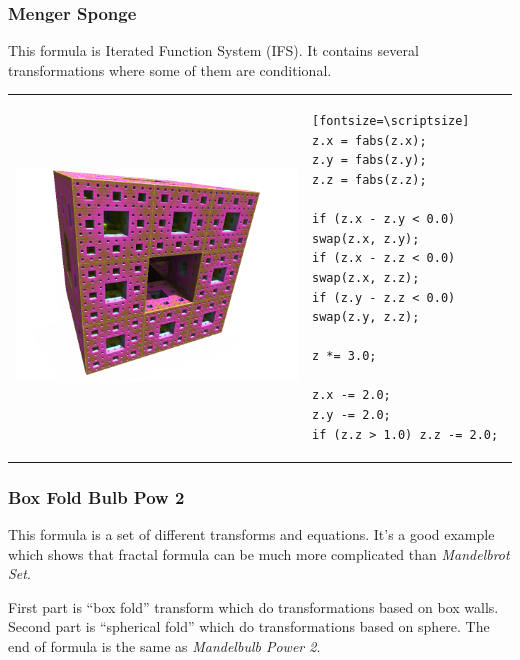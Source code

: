 \subsubsection{Menger Sponge} \nopagebreak

This formula is Iterated Function System (IFS). It contains several
transformations where some of them are conditional. \nopagebreak

\begin{tabular}{l l}
	\includegraphics[width=0.3\linewidth]{img/manual/media/formula_menger_sponge.png}	
	& 
	\begin{minipage}[b]{0.5\linewidth}
		\begin{verbatim}[fontsize=\scriptsize]
z.x = fabs(z.x);
z.y = fabs(z.y);
z.z = fabs(z.z);
		
if (z.x - z.y < 0.0) swap(z.x, z.y);
if (z.x - z.z < 0.0) swap(z.x, z.z);
if (z.y - z.z < 0.0) swap(z.y, z.z);
		
z *= 3.0;
		
z.x -= 2.0;
z.y -= 2.0;
if (z.z > 1.0) z.z -= 2.0;
		\end{verbatim}
	\end{minipage}
\end{tabular} 

\subsubsection{Box Fold Bulb Pow 2}
\nopagebreak

This formula is a set of different transforms and equations. It's a good example
which shows that fractal formula can be much more complicated than
\emph{Mandelbrot Set}.

First part is ``box fold'' transform which do
transformations based on box walls. Second part is ``spherical
fold'' which do transformations based on sphere.
The end of formula is the same as \emph{Mandelbulb Power 2}. \nopagebreak

